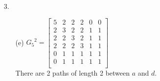 \documentclass[letterpaper,fleqn]{article}
\begin{document}
\begin{enumerate}
\begin{enumerate}
			\item [3.] \quad
			\begin{enumerate}
				\item [(e)]
				${G_5}^2=\begin{bmatrix*}
					5 & 2 & 2 & 2 & 0 & 0 \\
					2 & 3 & 2 & 2 & 1 & 1 \\
					2 & 2 & 3 & 2 & 1 & 1 \\
					2 & 2 & 2 & 3 & 1 & 1 \\
					0 & 1 & 1 & 1 & 1 & 1 \\
					0 & 1 & 1 & 1 & 1 & 1 \\
				\end{bmatrix*}$ \\
				There are 2 paths of length 2 between $a$ and $d$.
			\end{enumerate}
		\end{enumerate}
	\end{enumerate}
\end{document}
